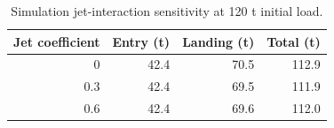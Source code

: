 \begin{table}[htbp]
\caption{Simulation jet-interaction sensitivity at 120 t initial load.}
\label{tab:src12}
\small
\setlength{\tabcolsep}{3.5pt}
\begin{tabularx}{\linewidth}{@{}rrrr@{}}
\toprule
Jet coefficient & Entry (t) & Landing (t) & Total (t) \\
\midrule
0 & 42.4 & 70.5 & 112.9 \\
0.3 & 42.4 & 69.5 & 111.9 \\
0.6 & 42.4 & 69.6 & 112.0 \\
\bottomrule
\end{tabularx}
\par{}
\par{}
\end{table}
